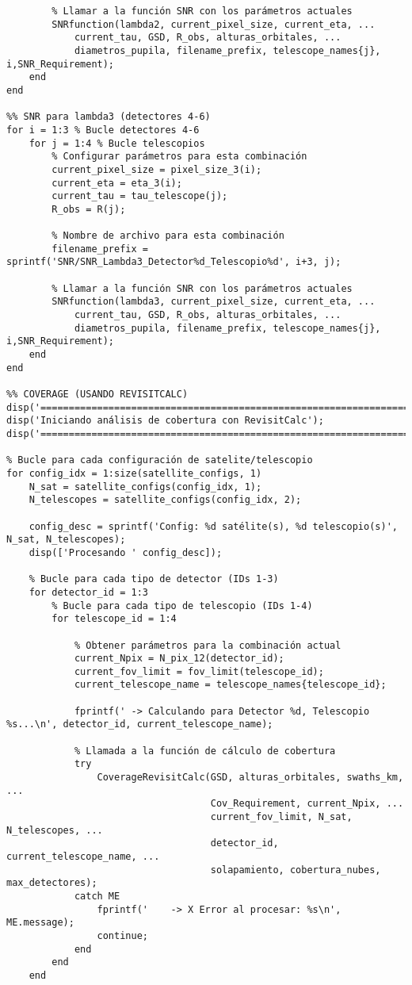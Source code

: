 \begin{verbatim}
        % Llamar a la función SNR con los parámetros actuales
        SNRfunction(lambda2, current_pixel_size, current_eta, ...
            current_tau, GSD, R_obs, alturas_orbitales, ...
            diametros_pupila, filename_prefix, telescope_names{j}, i,SNR_Requirement);
    end
end

%% SNR para lambda3 (detectores 4-6)
for i = 1:3 % Bucle detectores 4-6
    for j = 1:4 % Bucle telescopios
        % Configurar parámetros para esta combinación
        current_pixel_size = pixel_size_3(i);
        current_eta = eta_3(i);
        current_tau = tau_telescope(j);
        R_obs = R(j);
        
        % Nombre de archivo para esta combinación
        filename_prefix = sprintf('SNR/SNR_Lambda3_Detector%d_Telescopio%d', i+3, j);
        
        % Llamar a la función SNR con los parámetros actuales
        SNRfunction(lambda3, current_pixel_size, current_eta, ...
            current_tau, GSD, R_obs, alturas_orbitales, ...
            diametros_pupila, filename_prefix, telescope_names{j}, i,SNR_Requirement);
    end
end

%% COVERAGE (USANDO REVISITCALC)
disp('====================================================================');
disp('Iniciando análisis de cobertura con RevisitCalc');
disp('====================================================================');

% Bucle para cada configuración de satelite/telescopio
for config_idx = 1:size(satellite_configs, 1)
    N_sat = satellite_configs(config_idx, 1);
    N_telescopes = satellite_configs(config_idx, 2);

    config_desc = sprintf('Config: %d satélite(s), %d telescopio(s)', N_sat, N_telescopes);
    disp(['Procesando ' config_desc]);

    % Bucle para cada tipo de detector (IDs 1-3)
    for detector_id = 1:3
        % Bucle para cada tipo de telescopio (IDs 1-4)
        for telescope_id = 1:4
            
            % Obtener parámetros para la combinación actual
            current_Npix = N_pix_12(detector_id);
            current_fov_limit = fov_limit(telescope_id);
            current_telescope_name = telescope_names{telescope_id};

            fprintf(' -> Calculando para Detector %d, Telescopio %s...\n', detector_id, current_telescope_name);

            % Llamada a la función de cálculo de cobertura
            try
                CoverageRevisitCalc(GSD, alturas_orbitales, swaths_km, ...
                                    Cov_Requirement, current_Npix, ...
                                    current_fov_limit, N_sat, N_telescopes, ...
                                    detector_id, current_telescope_name, ...
                                    solapamiento, cobertura_nubes, max_detectores);
            catch ME
                fprintf('    -> X Error al procesar: %s\n', ME.message);
                continue;
            end
        end
    end
    

\end{verbatim}
